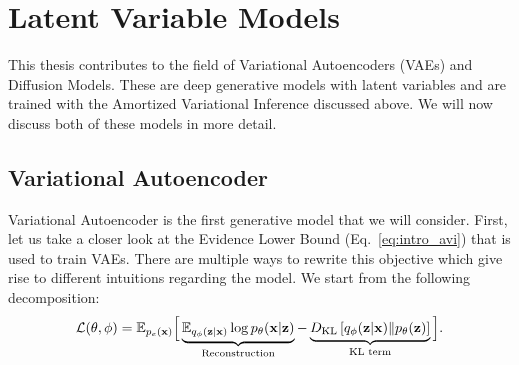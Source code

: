 \section{Latent Variable Models}\label{sec:into_latent_variable_models}
This thesis contributes to the field of Variational Autoencoders (VAEs) and Diffusion Models. These are deep generative models with latent variables and are trained with the Amortized Variational Inference discussed above. We will now discuss both of these models in more detail.

\subsection{Variational Autoencoder}
Variational Autoencoder is the first generative model that we will consider. 
First, let us take a closer look at the Evidence Lower Bound (Eq.~\ref{eq:intro_avi}) that is used to train VAEs. There are multiple ways to rewrite this objective which give rise to different intuitions regarding the model. We start from the following decomposition:
\begin{equation}\label{eq:intro_elbo_again}
\mathcal{L}(\theta, \phi) = \E_{p_e(\rvx)}\Big[ \underbrace{\E_{q_{\phi}(\rvz|\rvx)} \log p_{\theta}(\rvx| \rvz)}_{\text{Reconstruction}} - \underbrace{\KL{q_{\phi}(\rvz|\rvx)}{p_{\theta}(\rvz)}}_{\text{KL term}} \Big].
\end{equation}

